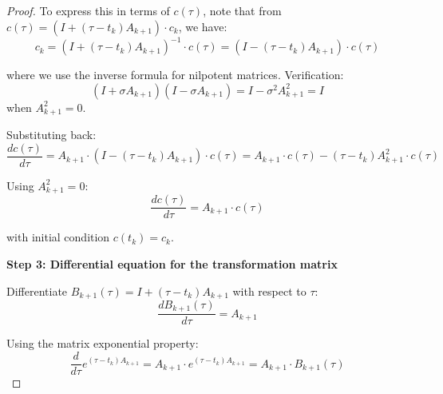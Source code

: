 \documentclass[11pt,a4paper]{article}
\theoremstyle{plain}
\theoremstyle{definition}
\begin{document}
\begin{proof}
\vspace{0.5em}

To express this in terms of $c(\tau)$, note that from $c(\tau) = (I + (\tau - t_k) A_{k+1}) \cdot c_k$, we have:
\begin{equation}
c_k = (I + (\tau - t_k) A_{k+1})^{-1} \cdot c(\tau) = (I - (\tau - t_k) A_{k+1}) \cdot c(\tau)
\end{equation}

\vspace{0.5em}

where we use the inverse formula for nilpotent matrices. Verification: 
\begin{equation}
(I + \sigma A_{k+1})(I - \sigma A_{k+1}) = I - \sigma^2 A_{k+1}^2 = I
\end{equation}
when $A_{k+1}^2 = 0$.

\vspace{0.5em}

Substituting back:
\begin{equation}
\frac{dc(\tau)}{d\tau} = A_{k+1} \cdot (I - (\tau - t_k) A_{k+1}) \cdot c(\tau) = A_{k+1} \cdot c(\tau) - (\tau - t_k) A_{k+1}^2 \cdot c(\tau)
\end{equation}

\vspace{0.5em}

Using $A_{k+1}^2 = 0$:
\begin{equation}
\boxed{\frac{dc(\tau)}{d\tau} = A_{k+1} \cdot c(\tau)}
\label{eq:diff_eq_state_app}
\end{equation}

\vspace{0.5em}

with initial condition $c(t_k) = c_k$.

\vspace{0.5em}

\textbf{Step 3: Differential equation for the transformation matrix}

\vspace{0.5em}

Differentiate $B_{k+1}(\tau) = I + (\tau - t_k) A_{k+1}$ with respect to $\tau$:
\begin{equation}
\frac{dB_{k+1}(\tau)}{d\tau} = A_{k+1}
\end{equation}

\vspace{0.5em}

Using the matrix exponential property:
\begin{equation}
\frac{d}{d\tau} e^{(\tau - t_k) A_{k+1}} = A_{k+1} \cdot e^{(\tau - t_k) A_{k+1}} = A_{k+1} \cdot B_{k+1}(\tau)
\end{equation}


\end{proof}
\end{document}
